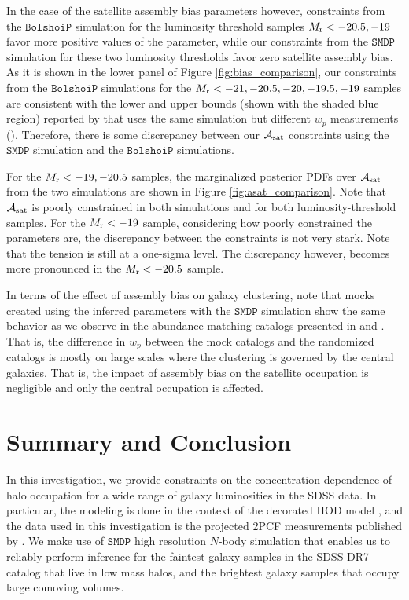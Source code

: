 \documentclass[12pt, preprint]{aastex}
\newcommand{\asat}{\mathcal{A}_{\rm sat}}
\begin{document}
In the case of the satellite assembly bias parameters however, constraints from the $\mathtt{BolshoiP}$ simulation for the luminosity threshold samples $M_{\rm r}<-20.5, -19$ favor more positive values of the parameter, while our constraints from the $\mathtt{SMDP}$ simulation for these two luminosity thresholds favor zero satellite assembly bias. As it is shown in the lower panel of Figure \ref{fig:bias_comparison}, our constraints from the $\mathtt{BolshoiP}$ simulations for the $M_{\rm r}<-21, -20.5, -20, -19.5, -19$ samples are consistent with the lower and upper bounds (shown with the shaded blue region) reported by \citet{zentner2016} that uses the same simulation but different $w_{p}$ measurements (\citealt{zehavi2011}). Therefore, there is some discrepancy between our $\asat$ constraints using the $\mathtt{SMDP}$ simulation and the $\mathtt{BolshoiP}$ simulations. 

For the $M_{\rm r}<-19, -20.5$ samples, the marginalized posterior PDFs over $\asat$ from the two simulations are shown in Figure \ref{fig:asat_comparison}. Note that $\asat$ is poorly constrained in both simulations and for both luminosity-threshold samples. For the $M_{\rm r}<-19$ sample, considering how poorly constrained the parameters are, the discrepancy between the constraints is not very stark. Note that the tension is still at a one-sigma level. The discrepancy however, becomes more pronounced in the $M_{\rm r}<-20.5$ sample. 

In terms of the effect of assembly bias on galaxy clustering, note that mocks created using the inferred parameters with the $\mathtt{SMDP}$ simulation show the same behavior as we observe in the abundance matching catalogs presented in \citet{arz2014} and \citet{lehman2015}. That is, the difference in $w_{p}$ between the mock catalogs and the randomized catalogs is mostly on large scales where the clustering is governed by the central galaxies. That is, the impact of assembly bias on the satellite occupation is negligible and only the central occupation is affected.  


\section{Summary and Conclusion}\label{sec:summary}

In this investigation, we provide constraints on the concentration-dependence of halo occupation for a wide range of galaxy luminosities in the SDSS data. In particular, the modeling is done in the context of the decorated HOD model \citet{decorated}, and the data used in this investigation is the projected 2PCF measurements published by \citet{guo2015}. We make use of $\mathtt{SMDP}$ high resolution $N$-body simulation that enables us to reliably perform inference for the faintest galaxy samples in the SDSS DR7 catalog that live in low mass halos, and the brightest galaxy samples that occupy large comoving volumes. 
\end{document}

